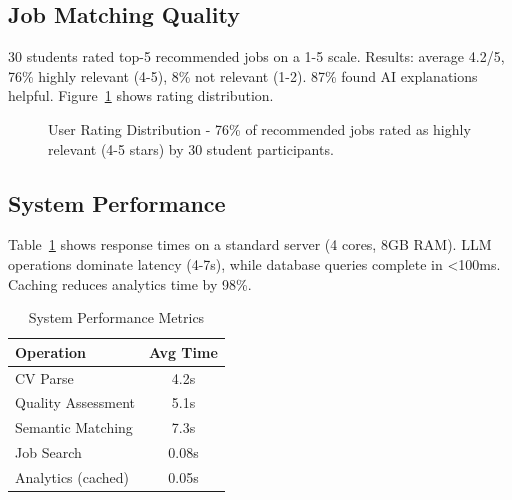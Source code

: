 \documentclass[conference]{IEEEtran}
\begin{document}
\subsection{Job Matching Quality}

30 students rated top-5 recommended jobs on a 1-5 scale. Results: average 4.2/5, 76\% highly relevant (4-5), 8\% not relevant (1-2). 87\% found AI explanations helpful. Figure~\ref{fig:user_ratings} shows rating distribution.

\begin{figure}[htbp]
\centering
{}
\caption{User Rating Distribution - 76\% of recommended jobs rated as highly relevant (4-5 stars) by 30 student participants.}
\label{fig:user_ratings}
\end{figure}

\subsection{System Performance}

Table~\ref{tab2} shows response times on a standard server (4 cores, 8GB RAM). LLM operations dominate latency (4-7s), while database queries complete in <100ms. Caching reduces analytics time by 98\%.

\begin{table}[htbp]
\caption{System Performance Metrics}
\begin{center}
\begin{tabular}{|l|c|}
\hline
\textbf{Operation} & \textbf{Avg Time} \\
\hline
CV Parse & 4.2s \\
Quality Assessment & 5.1s \\
Semantic Matching & 7.3s \\
Job Search & 0.08s \\
Analytics (cached) & 0.05s \\
\hline
\end{tabular}
\label{tab2}
\end{center}
\end{table}
\end{document}
